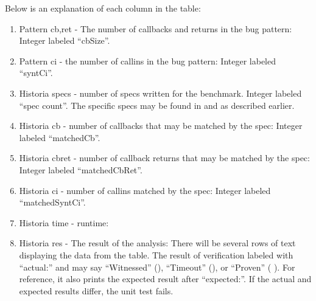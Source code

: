\documentclass{acmart} %
\begin{document}
\newcommand{\cTimeout}{\showclock{0}{45}}
\newsavebox{\cSafeBox}
\newcommand{\cSafe}{
\usebox{\cSafeBox}
}

\newsavebox{\cSafeToFiveBox}
\newcommand{\cSafeToFive}{
\usebox{\cSafeToFiveBox}
}

\newsavebox{\cAlarmBox}
\newcommand{\cAlarm}{\usebox{\cAlarmBox}}
%

Below is an explanation of each column in the table:
\begin{enumerate}
    \item Pattern cb,ret - The number of callbacks and returns in the bug pattern: Integer labeled ``cbSize''.
    \item Pattern ci - the number of callins in the bug pattern: Integer labeled ``syntCi''.
    \item Historia specs - number of specs written for the benchmark.  Integer labeled ``spec count''. The specific specs may be found in  and  as described earlier.
    \item Historia cb - number of callbacks that may be matched by the \newls spec: Integer labeled ``matchedCb''.
    \item Historia cbret - number of callback returns that may be matched by the \newls spec: Integer labeled ``matchedCbRet''.
    \item Historia ci - number of callins matched by the spec: Integer labeled ``matchedSyntCi''.
    \item Historia time - runtime: 
    \item Historia res - The result of the analysis: There will be several rows of text displaying the data from the table.  The result of verification labeled with ``actual:'' and may say ``Witnessed'' (\cAlarm), ``Timeout'' (\cTimeout), or ``Proven'' (\cSafe).  For reference, it also prints the expected result after ``expected:''.  If the actual and expected results differ, the unit test fails.
\end{enumerate}
\end{document}

